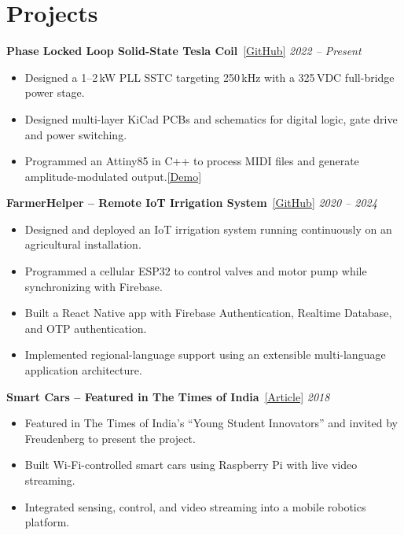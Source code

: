 \documentclass[11pt,letterpaper]{extarticle}
\newcommand{\linkedproject}[4]{%
    \vspace{10pt}
    \textbf{\large #2}~{\small\href{#1}{[#4]}}
    \hfill
    \textit{#3}\\[-15pt]
}
\begin{document}
\section{Projects}

\linkedproject
    {https://github.com/Pranav2008-droid/PLL-SSTC}
    {Phase Locked Loop Solid-State Tesla Coil}
    {2022 -- Present}
    {GitHub}

\begin{itemize}
    \item Designed a 1--2\,kW PLL SSTC targeting 250\,kHz with a 325\,VDC full-bridge power stage.
    \item Designed multi-layer KiCad PCBs and schematics for digital logic, gate drive and power switching.
    \item Programmed an Attiny85 in C++ to process MIDI files and generate amplitude-modulated output.\href{https://youtube.com/shorts/cHrE9xm2R9Q}{[Demo]}
\end{itemize}

\linkedproject
    {https://github.com/Pranav2008-droid/farmerhelper}
    {FarmerHelper -- Remote IoT Irrigation System}
    {2020 -- 2024}
    {GitHub}

\begin{itemize}
    \item Designed and deployed an IoT irrigation system running continuously on an agricultural installation.
    \item Programmed a cellular ESP32 to control valves and  motor pump while synchronizing with Firebase.
    \item Built a React Native app with Firebase Authentication, Realtime Database, and OTP authentication.
    \item Implemented regional-language support using an extensible multi-language application architecture.
\end{itemize}

\linkedproject
    {https://timesofindia.indiatimes.com/life-style/spotlight/young-student-innovators-from-bengaluru/articleshow/65855901.cms}
    {Smart Cars -- Featured in The Times of India}
    {2018}
    {Article}

\begin{itemize}
    \item Featured in The Times of India's ``Young Student Innovators'' and invited by Freudenberg to present the project.
    \item Built Wi-Fi-controlled smart cars using Raspberry Pi with live video streaming. 
    \item Integrated sensing, control, and video streaming into a mobile robotics platform.
\end{itemize}
\end{document}
